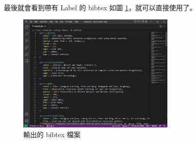 最後就會看到帶有 Label 的 bibtex 如圖 \ref{fig_bibtex}，就可以直接使用了。

\begin{figure}[H] 
    \centering 
    \includegraphics[width=0.7\textwidth]{Figures/Endnote/bibtex.png} 
    \caption{輸出的 bibtex 檔案}
    \label{fig_bibtex}
\end{figure}